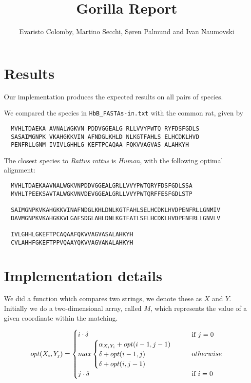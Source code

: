\documentclass{tufte-handout}
\title{Gorilla Report}
\author{Evaristo Colomby, Martino Secchi, Søren Palmund and Ivan Naumovski}
\begin{document}
  \maketitle

  \section{Results}

  Our implementation produces the expected results on all pairs of species.

  We compared the species in \verb!HbB_FASTAs-in.txt!
  with the common rat, given by

  \begin{verbatim}
  MVHLTDAEKA AVNALWGKVN PDDVGGEALG RLLVVYPWTQ RYFDSFGDLS
  SASAIMGNPK VKAHGKKVIN AFNDGLKHLD NLKGTFAHLS ELHCDKLHVD
  PENFRLLGNM IVIVLGHHLG KEFTPCAQAA FQKVVAGVAS ALAHKYH
  \end{verbatim}

  The closest species to \emph{Rattus rattus} is  \emph{Human}, with the following optimal alignment:

\medskip
  \begin{fullwidth}\small
  \begin{verbatim}
  MVHLTDAEKAAVNALWGKVNPDDVGGEALGRLLVVYPWTQRYFDSFGDLSSA
  MVHLTPEEKSAVTALWGKVNVDEVGGEALGRLLVVYPWTQRFFESFGDLSTP

  SAIMGNPKVKAHGKKVINAFNDGLKHLDNLKGTFAHLSELHCDKLHVDPENFRLLGNMIV
  DAVMGNPKVKAHGKKVLGAFSDGLAHLDNLKGTFATLSELHCDKLHVDPENFRLLGNVLV

  IVLGHHLGKEFTPCAQAAFQKVVAGVASALAHKYH
  CVLAHHFGKEFTPPVQAAYQKVVAGVANALAHKYH
  \end{verbatim}
\end{fullwidth}



  \section{Implementation details}
We did a function which compares two strings, we denote these as $X$ and  $Y$.
Initially we do a two-dimensional array, called $M$, which represents the value of a given coordinate within the matching.

\begin{equation}
    opt(X_i, Y_j) =
    \begin{cases}
    	i\cdot\delta       			& \quad \text{if } j = 0\\
        max 	\begin{cases}
        \alpha_{X_i Y_i} + opt(i-1, j-1)\\
        \delta + opt(i-1, j)\\
        \delta + opt(i, j-1)\\
\end{cases}				& \quad \text otherwise \\
        j\cdot\delta	& \quad \text{if } i = 0  \\
    \end{cases}
\end{equation}\newline
\end{document}
